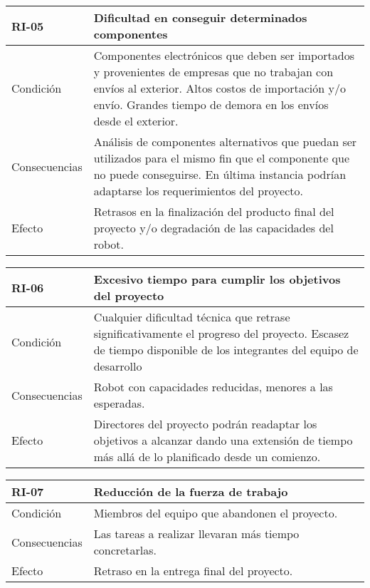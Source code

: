 \begin{center}
\begin{tabular} {|m{2.5cm}|m{11.5cm}|}
	\hline
	RI-05 & Dificultad en conseguir determinados componentes \\
	\hline
    	Condición & Componentes electrónicos que deben ser importados y provenientes de empresas que no trabajan con envíos al exterior. Altos costos de importación y/o envío. Grandes tiempo de demora en los envíos desde el exterior. \\
	\hline
    	Consecuencias & Análisis de componentes alternativos que puedan ser utilizados para el mismo fin que el componente que no puede conseguirse. En última instancia podrían adaptarse los requerimientos del proyecto. \\
	\hline
    	Efecto & Retrasos en la finalización del producto final del proyecto y/o degradación de las capacidades del robot. \\
	\hline
\end{tabular}
\end{center}

\begin{center}
\begin{tabular} {|m{2.5cm}|m{11.5cm}|}
	\hline
	RI-06 & Excesivo tiempo para cumplir los objetivos del proyecto \\
	\hline
    	Condición & Cualquier dificultad técnica que retrase significativamente el progreso del proyecto. Escasez de tiempo disponible de los integrantes del equipo de desarrollo \\
	\hline
    	Consecuencias & Robot con capacidades reducidas, menores a las esperadas. \\
	\hline
    	Efecto & Directores del proyecto podrán readaptar los objetivos a alcanzar dando una extensión de tiempo más allá de lo planificado desde un comienzo. \\
	\hline
\end{tabular}
\end{center}

\begin{center}
\begin{tabular} {|m{2.5cm}|m{11.5cm}|}
	\hline
	RI-07 & Reducción de la fuerza de trabajo \\
	\hline
    	Condición & Miembros del equipo que abandonen el proyecto. \\
	\hline
    	Consecuencias & Las tareas a realizar llevaran más tiempo concretarlas. \\
	\hline
    	Efecto & Retraso en la entrega final del proyecto. \\
	\hline
\end{tabular}
\end{center}

